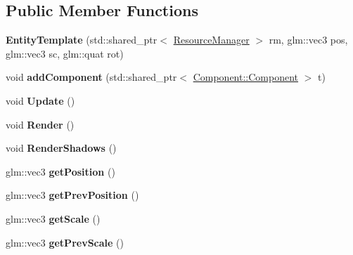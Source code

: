 \subsection*{Public Member Functions}
\begin{DoxyCompactItemize}
\item 
{\bfseries Entity\+Template} (std\+::shared\+\_\+ptr$<$ \hyperlink{class_resource_manager}{Resource\+Manager} $>$ rm, glm\+::vec3 pos, glm\+::vec3 sc, glm\+::quat rot)\hypertarget{class_entity_template_a835da6ccca2b8fbf53db7cb1ebffa85a}{}\label{class_entity_template_a835da6ccca2b8fbf53db7cb1ebffa85a}

\item 
void {\bfseries add\+Component} (std\+::shared\+\_\+ptr$<$ \hyperlink{class_component_1_1_component}{Component\+::\+Component} $>$ t)\hypertarget{class_entity_template_ac8321b22a8c2a781634850d9fab6df4e}{}\label{class_entity_template_ac8321b22a8c2a781634850d9fab6df4e}

\item 
void {\bfseries Update} ()\hypertarget{class_entity_template_a3d3a948716b31911b55f124f41994bb8}{}\label{class_entity_template_a3d3a948716b31911b55f124f41994bb8}

\item 
void {\bfseries Render} ()\hypertarget{class_entity_template_ac8ea339efcf5ccfdd4a9be8220830aef}{}\label{class_entity_template_ac8ea339efcf5ccfdd4a9be8220830aef}

\item 
void {\bfseries Render\+Shadows} ()\hypertarget{class_entity_template_aeff24e4911790a2c2f5a3f1044399a66}{}\label{class_entity_template_aeff24e4911790a2c2f5a3f1044399a66}

\item 
glm\+::vec3 {\bfseries get\+Position} ()\hypertarget{class_entity_template_a58b67e09dc139f0e6c524d13dffaa14d}{}\label{class_entity_template_a58b67e09dc139f0e6c524d13dffaa14d}

\item 
glm\+::vec3 {\bfseries get\+Prev\+Position} ()\hypertarget{class_entity_template_ab32c01732ae30bce09349205a5dcc15a}{}\label{class_entity_template_ab32c01732ae30bce09349205a5dcc15a}

\item 
glm\+::vec3 {\bfseries get\+Scale} ()\hypertarget{class_entity_template_a8d63187b137c8da1cc1b68a3b3a9b5d3}{}\label{class_entity_template_a8d63187b137c8da1cc1b68a3b3a9b5d3}

\item 
glm\+::vec3 {\bfseries get\+Prev\+Scale} ()\hypertarget{class_entity_template_ad2aa2fa03dbf878bfe81065564172b9c}{}\label{class_entity_template_ad2aa2fa03dbf878bfe81065564172b9c}


\end{DoxyCompactItemize}
